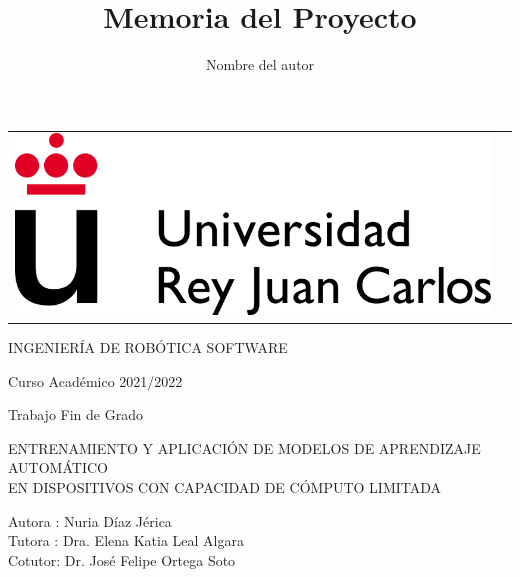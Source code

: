\documentclass[a4paper, 12pt]{book}
\title{Memoria del Proyecto}
\author{Nombre del autor}
\begin{document}
 


\begin{titlepage}
\begin{center}
\begin{tabular}[c]{c c}
\includegraphics[scale=1.5]{img/LogoURJC.png}
\\
\end{tabular}

\vspace{3cm}

\Large 
INGENIERÍA DE ROBÓTICA SOFTWARE

\vspace{0.4cm}

\large
Curso Académico 2021/2022

\vspace{0.8cm}

Trabajo Fin de Grado

\vspace{2cm}

\LARGE ENTRENAMIENTO Y APLICACIÓN DE MODELOS DE APRENDIZAJE AUTOMÁTICO \\
EN DISPOSITIVOS CON CAPACIDAD DE CÓMPUTO LIMITADA

\vspace{3cm}

\large
Autora : Nuria Díaz Jérica \\
Tutora : Dra. Elena Katia Leal Algara \\
Cotutor: Dr. José Felipe Ortega Soto
\end{center}
\end{titlepage}
\end{document}
